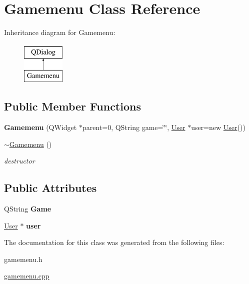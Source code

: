\hypertarget{classGamemenu}{\section{Gamemenu Class Reference}
\label{classGamemenu}
}
Inheritance diagram for Gamemenu\-:\begin{figure}[H]
\begin{center}
\leavevmode
\includegraphics[height=2.000000cm]{classGamemenu}
\end{center}
\end{figure}
\subsection*{Public Member Functions}
\begin{DoxyCompactItemize}
\item 
\hypertarget{classGamemenu_a93a8b2e28dae56b3bededa8aa0727fa5}{{\bfseries Gamemenu} (Q\-Widget $\ast$parent=0, Q\-String game=\char`\"{}\char`\"{}, \hyperlink{classUser}{User} $\ast$user=new \hyperlink{classUser}{User}())}\label{classGamemenu_a93a8b2e28dae56b3bededa8aa0727fa5}

\item 
\hypertarget{classGamemenu_a3ed45d70a8f2fb73ca5900252a350ff1}{\hyperlink{classGamemenu_a3ed45d70a8f2fb73ca5900252a350ff1}{$\sim$\-Gamemenu} ()}\label{classGamemenu_a3ed45d70a8f2fb73ca5900252a350ff1}

\begin{DoxyCompactList}\small\item\em destructor \end{DoxyCompactList}\end{DoxyCompactItemize}
\subsection*{Public Attributes}
\begin{DoxyCompactItemize}
\item 
\hypertarget{classGamemenu_ae931024c5e37bbbb5776a81461597939}{Q\-String {\bfseries Game}}\label{classGamemenu_ae931024c5e37bbbb5776a81461597939}

\item 
\hypertarget{classGamemenu_a44560505e0acfb662c0438e58b15bf94}{\hyperlink{classUser}{User} $\ast$ {\bfseries user}}\label{classGamemenu_a44560505e0acfb662c0438e58b15bf94}

\end{DoxyCompactItemize}


The documentation for this class was generated from the following files\-:\begin{DoxyCompactItemize}
\item 
gamemenu.\-h\item 
\hyperlink{gamemenu_8cpp}{gamemenu.\-cpp}\end{DoxyCompactItemize}
